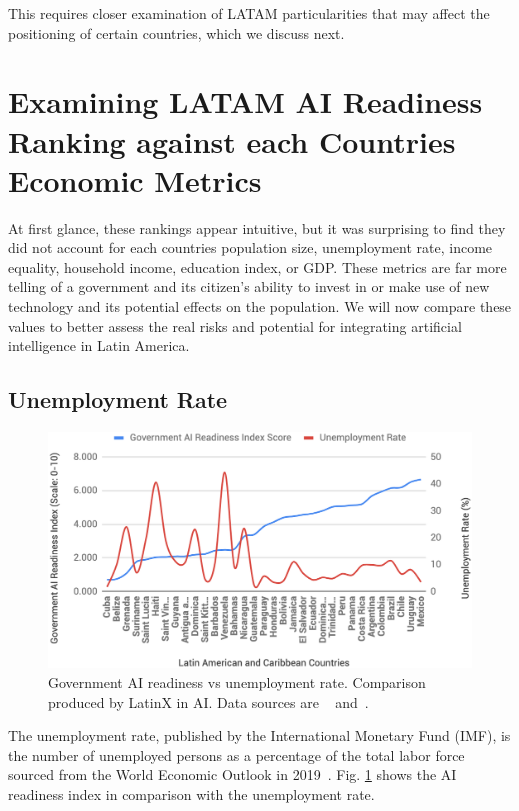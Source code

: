 \documentclass[conference]{IEEEtran}
\begin{document}
This requires closer examination of LATAM particularities that may affect the positioning of certain countries, which we discuss next.


\section{Examining LATAM AI Readiness Ranking against each Countries Economic Metrics}

At first glance, these rankings appear intuitive, but it was surprising to find they did not account for each countries population size, unemployment rate, income equality, household income, education index, or GDP. These metrics are far more telling of a government and its citizen's ability to invest in or make use of new technology and its potential effects on the population. We will now compare these values to better assess the real risks and potential for integrating artificial intelligence in Latin America.

\subsection{Unemployment Rate}

\begin{figure}[!t]
\centering
\includegraphics[width=\columnwidth]{unemployment}
\caption{Government AI readiness vs unemployment rate. Comparison produced by LatinX in AI\texttrademark. Data sources are ~\cite{miller2019government} and~\cite{nam2019world}.}
\label{fig:unemployment}
\end{figure}

The unemployment rate, published by the International Monetary Fund (IMF), is the number of unemployed persons as a percentage of the total labor force sourced from the World Economic Outlook in 2019~\cite{nam2019world}. Fig. \ref{fig:unemployment} shows the AI readiness index in comparison with the unemployment rate. 
\end{document}
